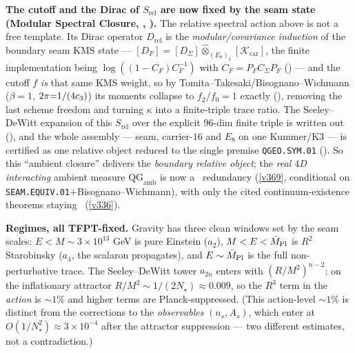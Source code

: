 \par\smallskip\noindent\textbf{The cutoff and the Dirac of $S_{\mathrm{rel}}$ are now fixed by the seam state
(Modular Spectral Closure, , ).}
The relative spectral action above is not a free template. Its Dirac operator $D_{\mathrm{rel}}$ is the
\emph{modular/covariance induction} of the boundary seam KMS state --- $[D_F]=[D_\Sigma]\widehat\otimes_{(E_8)_1}
[\mathcal K_{\mathrm{car}}]$, the finite implementation being $\log((1{-}C_F)C_F^{-1})$ with $C_F=P_F C_\Sigma
P_F$ () --- and the cutoff $f$ \emph{is} that same KMS weight, so by
Tomita--Takesaki/Bisognano--Wichmann ($\beta{=}1$, $2\pi{=}1/(4c_3)$) its moments collapse to $f_2/f_0=1$
exactly (), removing the last scheme freedom and turning $\kappa$ into a
finite-triple trace ratio. The Seeley--DeWitt expansion of this $S_{\mathrm{rel}}$ over the explicit $96$-dim
finite triple is written out (), and the whole assembly --- seam,
carrier-$16$ and $E_8$ on one Kummer/K3 --- is certified as one relative object reduced to the single premise
\texttt{QGEO.SYM.01} (). So this ``ambient closure'' delivers the
\emph{boundary relative object}; the \emph{real $4$D interacting} ambient measure $\mathrm{QG}_{\mathrm{amb}}$ is
now a \mC\ redundancy (\vref{v369}, conditional on \texttt{SEAM.EQUIV.01}${+}$Bisognano--Wichmann), with only the
cited continuum-existence theorems staying \mO\ (\vref{v336}).

\noindent\textbf{Regimes, all TFPT-fixed.} Gravity has three clean windows set by the seam scales:
$E<M\!\sim\!3\times10^{13}$ GeV is pure Einstein ($a_2$), $M<E<\bar M_{\mathrm{Pl}}$ is $R^2$ Starobinsky ($a_4$, the
scalaron propagates), and $E\sim\bar M_{\mathrm{Pl}}$ is the full non-perturbative trace. The Seeley--DeWitt tower
$a_{2n}$ enters with $(R/M^2)^{n-2}$; on the inflationary attractor $R/M^2\sim1/(2N_\star)\approx0.009$,
so the $R^3$ term in the \emph{action} is $\sim1\%$ and higher terms are Planck-suppressed. (This action-level
$\sim1\%$ is distinct from the corrections to the \emph{observables} $(n_s,A_s)$, which enter at
$O(1/N_\star^2)\approx3\times10^{-4}$ after the attractor suppression --- two different estimates, not a
contradiction.)

